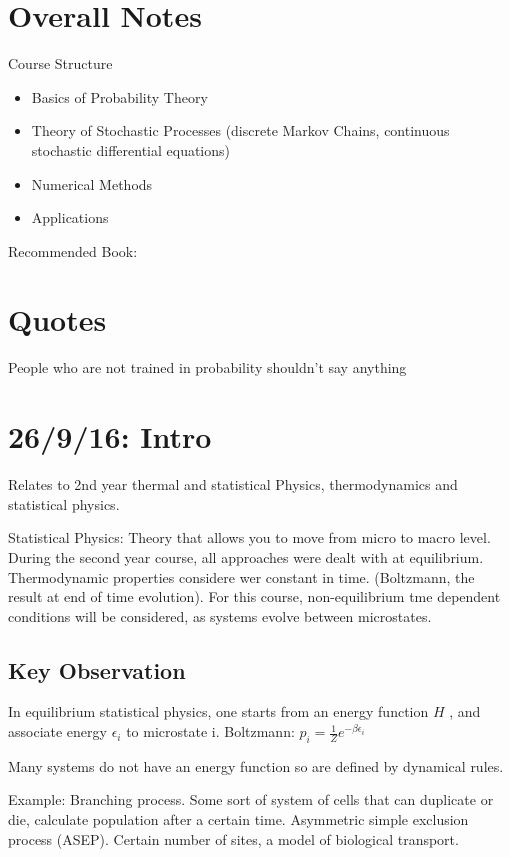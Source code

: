 \documentclass[]{article}
\begin{document}
\large

\section*{Overall Notes}

Course Structure
\begin{itemize}
	\item Basics of Probability Theory
	\item Theory of Stochastic Processes (discrete Markov Chains, continuous stochastic differential equations)
	\item Numerical Methods
	\item Applications
\end{itemize}

Recommended Book:

\section*{Quotes}

	People who are not trained in probability shouldn't say anything

\section{26/9/16: Intro}

Relates to 2nd year thermal and statistical Physics, thermodynamics and statistical physics.

Statistical Physics: Theory that allows you to move from micro to macro level. During the second year course, all approaches were dealt with at equilibrium. Thermodynamic properties considere wer constant in time. (Boltzmann, the result at end of time evolution). For this course, non-equilibrium tme dependent conditions will be considered, as systems evolve between microstates.

	\subsection{Key Observation}
		In equilibrium statistical physics, one starts from an energy function $H$ , and associate energy $\epsilon_i$ to microstate i.  Boltzmann: $p_i = \frac{1}{Z}e^{-\beta\epsilon_i}$
		
		Many systems do not have an energy function so are defined by dynamical rules.
		
		Example: Branching process. Some sort of system of cells that can duplicate or die, calculate population after a certain time.
		Asymmetric simple exclusion process (ASEP). Certain number of sites, a model of biological transport.
	
\end{document}
